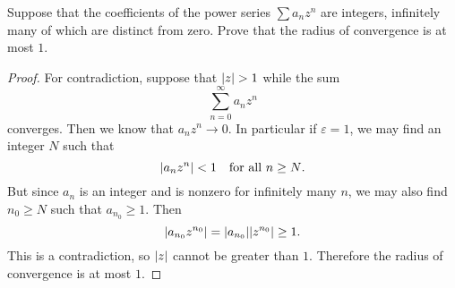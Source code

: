  Suppose that the coefficients of the power series
$\sum a_nz^n$ are integers, infinitely many of which are distinct from
zero. Prove that the radius of convergence is at most $1$.
\begin{proof}
  For contradiction, suppose that $\lvert{z}\rvert > 1$ while the sum
  \begin{equation*}
    \sum_{n=0}^\infty a_nz^n
  \end{equation*}
  converges. Then we know that $a_nz^n\to0$. In particular if
  $\varepsilon = 1$, we may find an integer $N$ such that
  \begin{equation*}
    \lvert{a_nz^n}\rvert < 1
    \quad\text{for all $n\geq N$}.
  \end{equation*}
  But since $a_n$ is an integer and is nonzero for infinitely many
  $n$, we may also find $n_0\geq N$ such that $a_{n_0}\geq1$. Then
  \begin{equation*}
    \lvert{a_{n_0}z^{n_0}}\rvert = \lvert{a_{n_0}}\rvert\lvert{z^{n_0}}\rvert \geq 1.
  \end{equation*}
  This is a contradiction, so $\lvert{z}\rvert$ cannot be greater than
  $1$. Therefore the radius of convergence is at most $1$.
\end{proof}
